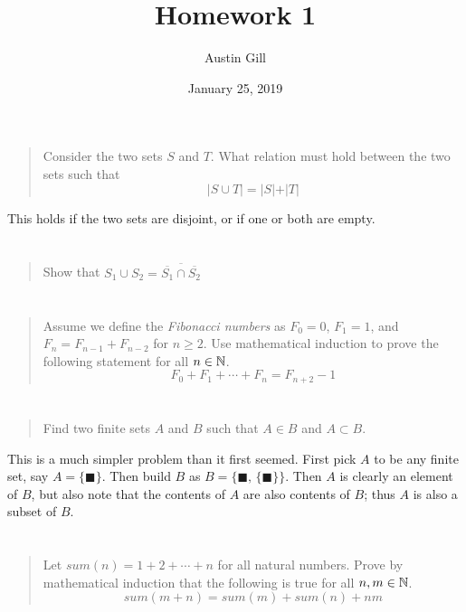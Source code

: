 \documentclass{article}
\title{Homework 1}
\author{Austin Gill}
\date{January 25, 2019}
\begin{document}
\maketitle

\section{}
\begin{quote}
    Consider the two sets $S$ and $T$. What relation must hold between the
    two sets such that
    \[\vert S \cup T \vert = \vert S \vert + \vert T \vert \]
\end{quote}
This holds if the two sets are disjoint, or if one or both are empty.

\section{}
\begin{quote}
    Show that $S_1 \cup S_2 = \overline{\overline{S_1} \cap \overline{S_2}}$
\end{quote}

\section{}
\begin{quote}
    Assume we define the \textit{Fibonacci numbers} as $F_0 = 0$, $F_1 = 1$,
    and $F_n = F_{n-1} + F_{n-2}$ for $n \geq 2$. Use mathematical induction to
    prove the following statement for all $n \in \mathbb{N}$.
    \[F_0 + F_1 + \cdots + F_n = F_{n + 2} - 1\]
\end{quote}

\section{}
\begin{quote}
    Find two finite sets $A$ and $B$ such that $A \in B$ and $A \subset B$.
\end{quote}

This is a much simpler problem than it first seemed. First pick $A$ to be any finite set, say $A =
    \{\blacksquare \}$. Then build $B$ as $B = \big \{\blacksquare,\, \{\blacksquare \} \big \}$.
Then $A$ is clearly an element of $B$, but also note that the contents of $A$ are also
contents of $B$; thus $A$ is also a subset of $B$.

\section{}
\begin{quote}
    Let $sum(n) = 1 + 2 + \cdots + n$ for all natural numbers. Prove by
    mathematical induction that the following is true for all $n, m \in \mathbb{N}$.
    \[ sum(m + n) = sum(m) + sum(n) + nm \]
\end{quote}
\end{document}
